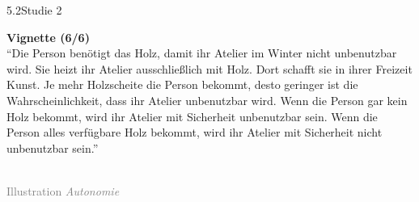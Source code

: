\documentclass[xcolor=table,9pt,aspectratio=169]{beamer}
\begin{document}
\begin{frame}{\vspace*{10mm}5.2\hspace*{1em}Studie 2}
\begin{multicols}{2}
   \textbf{Vignette (6/6)}\\
   \medskip
   \enquote{Die Person benötigt das Holz, damit ihr Atelier im Winter nicht unbenutzbar wird. Sie heizt ihr Atelier ausschließlich mit Holz. Dort schafft sie in ihrer Freizeit Kunst. Je mehr Holzscheite die Person bekommt, desto geringer ist die Wahrscheinlichkeit, dass ihr Atelier unbenutzbar wird. Wenn die Person gar kein Holz bekommt, wird ihr Atelier mit Sicherheit unbenutzbar sein. Wenn die Person alles verfügbare Holz bekommt, wird ihr Atelier mit Sicherheit nicht unbenutzbar sein.}\\
   \vfill
   \begin{center}
      \\
      \textcolor{gray}{Illustration \textit{Autonomie}}
   \end{center}
\end{multicols}
\end{frame}
\end{document}
